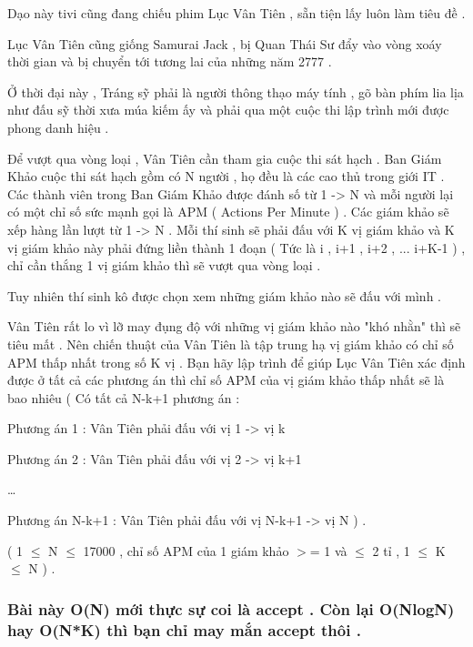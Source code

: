 



   Dạo này tivi cũng đang chiếu phim Lục Vân Tiên , sẵn tiện lấy luôn làm tiêu đề .   


   Lục Vân Tiên cũng giống Samurai Jack , bị Quan Thái Sư đẩy vào vòng xoáy thời gian và bị chuyển tới tương lai của những năm 2777 .   


   Ở thời đại này , Tráng sỹ phải là người thông thạo máy tính , gõ bàn phím lia lịa như đấu sỹ thời xưa múa kiếm ấy và phải qua một cuộc thi lập trình mới được phong danh hiệu .   


   Để vượt qua vòng loại , Vân Tiên cần tham gia cuộc thi sát hạch . Ban Giám Khảo cuộc thi sát hạch gồm có N người , họ đều là các cao thủ trong giới IT . Các thành viên trong Ban Giám Khảo được đánh số từ 1 -> N và mỗi người lại có một chỉ số sức mạnh gọi là APM ( Actions Per Minute ) . Các giám khảo sẽ xếp hàng lần lượt từ 1 -> N . Mỗi thí sinh sẽ phải đấu với K vị giám khảo và K vị giám khảo này phải đứng liền thành 1 đoạn ( Tức là i , i+1 , i+2 , ... i+K-1 ) , chỉ cần thắng 1 vị giám khảo thì sẽ vượt qua vòng loại .   


   Tuy nhiên thí sinh kô được chọn xem những giám khảo nào sẽ đấu với mình .   


   Vân Tiên rất lo vì lỡ may đụng độ với những vị giám khảo nào "khó nhằn" thì sẽ tiêu mất . Nên chiến thuật của Vân Tiên là tập trung hạ vị giám khảo có chỉ số APM thấp nhất trong số K vị . Bạn hãy lập trình để giúp Lục Vân Tiên xác định được ở tất cả các phương án thì chỉ số APM của vị giám khảo thấp nhất sẽ là bao nhiêu ( Có tất cả N-k+1 phương án :   


   Phương án 1 : Vân Tiên phải đấu với vị 1 -> vị k   


   Phương án 2 : Vân Tiên phải đấu với vị 2 -> vị k+1   


   …   


   Phương án N-k+1  : Vân Tiên phải đấu với vị N-k+1 -> vị N ) .   





   ( 1  $\le$  N  $\le$  17000 , chỉ số APM của 1 giám khảo $>$= 1 và  $\le$  2 tỉ , 1  $\le$  K  $\le$  N ) .  

\subsubsection{   Bài này O(N) mới thực sự coi là accept . Còn lại O(NlogN) hay O(N*K) thì bạn chỉ may mắn accept thôi .  }

